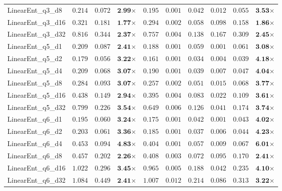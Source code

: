 \begin{table*}[t]
{\begin{tabular}{| l || r r c || r r r r r c |}
LinearEnt\_q3\_d8 & $0.214$ & $0.072$ & $\textbf{2.99}$$\times$ & $0.195$ & $0.001$ & $0.042$ & $0.012$ & $0.055$ & $\textbf{3.53}$$\times$ \\
LinearEnt\_q3\_d16 & $0.321$ & $0.181$ & $\textbf{1.77}$$\times$ & $0.294$ & $0.002$ & $0.058$ & $0.098$ & $0.158$ & $\textbf{1.86}$$\times$ \\
LinearEnt\_q3\_d32 & $0.816$ & $0.344$ & $\textbf{2.37}$$\times$ & $0.757$ & $0.004$ & $0.138$ & $0.167$ & $0.309$ & $\textbf{2.45}$$\times$ \\
LinearEnt\_q5\_d1 & $0.209$ & $0.087$ & $\textbf{2.41}$$\times$ & $0.188$ & $0.001$ & $0.059$ & $0.001$ & $0.061$ & $\textbf{3.08}$$\times$ \\
LinearEnt\_q5\_d2 & $0.179$ & $0.056$ & $\textbf{3.22}$$\times$ & $0.161$ & $0.001$ & $0.034$ & $0.004$ & $0.039$ & $\textbf{4.18}$$\times$ \\
LinearEnt\_q5\_d4 & $0.209$ & $0.068$ & $\textbf{3.07}$$\times$ & $0.190$ & $0.001$ & $0.039$ & $0.007$ & $0.047$ & $\textbf{4.04}$$\times$ \\
LinearEnt\_q5\_d8 & $0.284$ & $0.093$ & $\textbf{3.07}$$\times$ & $0.257$ & $0.002$ & $0.051$ & $0.015$ & $0.068$ & $\textbf{3.77}$$\times$ \\
LinearEnt\_q5\_d16 & $0.438$ & $0.149$ & $\textbf{2.94}$$\times$ & $0.395$ & $0.004$ & $0.083$ & $0.022$ & $0.109$ & $\textbf{3.61}$$\times$ \\
LinearEnt\_q5\_d32 & $0.799$ & $0.226$ & $\textbf{3.54}$$\times$ & $0.649$ & $0.006$ & $0.126$ & $0.041$ & $0.174$ & $\textbf{3.74}$$\times$ \\
LinearEnt\_q6\_d1 & $0.195$ & $0.060$ & $\textbf{3.24}$$\times$ & $0.175$ & $0.001$ & $0.042$ & $0.001$ & $0.043$ & $\textbf{4.02}$$\times$ \\
LinearEnt\_q6\_d2 & $0.203$ & $0.061$ & $\textbf{3.36}$$\times$ & $0.185$ & $0.001$ & $0.037$ & $0.006$ & $0.044$ & $\textbf{4.23}$$\times$ \\
LinearEnt\_q6\_d4 & $0.453$ & $0.094$ & $\textbf{4.83}$$\times$ & $0.404$ & $0.001$ & $0.057$ & $0.009$ & $0.067$ & $\textbf{6.01}$$\times$ \\
LinearEnt\_q6\_d8 & $0.457$ & $0.202$ & $\textbf{2.26}$$\times$ & $0.408$ & $0.003$ & $0.072$ & $0.095$ & $0.170$ & $\textbf{2.41}$$\times$ \\
LinearEnt\_q6\_d16 & $1.022$ & $0.296$ & $\textbf{3.45}$$\times$ & $0.965$ & $0.005$ & $0.188$ & $0.042$ & $0.235$ & $\textbf{4.10}$$\times$ \\
LinearEnt\_q6\_d32 & $1.084$ & $0.449$ & $\textbf{2.41}$$\times$ & $1.007$ & $0.012$ & $0.214$ & $0.086$ & $0.313$ & $\textbf{3.22}$$\times$ \\

\end{tabular}}
\end{table*}
